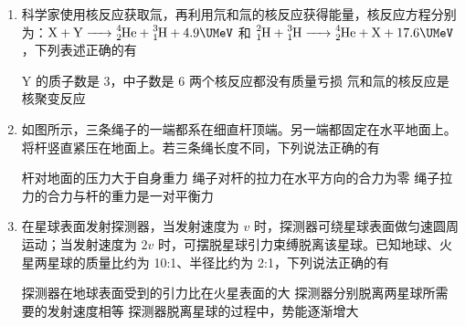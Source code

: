 \documentclass[\gkver]{gaokaozhenti}
\begin{document}
\begin{enumerate}
\item
科学家使用核反应获取氚，再利用氘和氚的核反应获得能量，核反应方程分别为：$\ce{X + Y -> ^{4}_{2}He + ^{3}_{1}H} + 4.9\UMeV$ 和 $\ce{^{2}_{1}H + ^{3}_{1}H -> ^{4}_{2}He + X} + 17.6\UMeV$，下列表述正确的有

{Y 的质子数是 3，中子数是 6}
{两个核反应都没有质量亏损}
{氘和氚的核反应是核聚变反应}


\item
如图所示，三条绳子的一端都系在细直杆顶端。另一端都固定在水平地面上。将杆竖直紧压在地面上。若三条绳长度不同，下列说法正确的有


{杆对地面的压力大于自身重力}
{绳子对杆的拉力在水平方向的合力为零}
{绳子拉力的合力与杆的重力是一对平衡力}


\item
在星球表面发射探测器，当发射速度为 $v$ 时，探测器可绕星球表面做匀速圆周运动；当发射速度为 $2v$ 时，可摆脱星球引力束缚脱离该星球。已知地球、火星两星球的质量比约为 10:1、半径比约为 2:1，下列说法正确的有

{探测器在地球表面受到的引力比在火星表面的大}
{探测器分别脱离两星球所需要的发射速度相等}
{探测器脱离星球的过程中，势能逐渐增大}


\end{enumerate}
\end{document}
